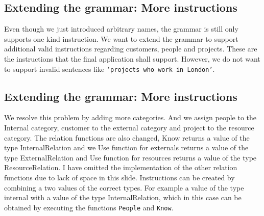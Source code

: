 \documentclass[
10pt, %
a4paper, %
oneside, %
headinclude,footinclude, %
BCOR5mm, %
]{scrartcl}
\begin{document}
\subsection{Extending the grammar: More instructions}
Even though we just introduced arbitrary names, the grammar is still only supports one kind instruction.
\newline
\newline
We want to extend the grammar to support additional valid instructions regarding customers, people and projects.
\newline
\newline
These are the instructions that the final application shall support.
\newline
\newline
However, we do not want to support invalid sentences like \texttt{'projects who work in London'}.

\subsection{Extending the grammar: More instructions}
We resolve this problem by adding more categories.
\newline
\newline
And we assign people to the Internal category, customer to the external category and project to the resource category.
\newline
\newline
The relation functions are also changed, Know returns a value of the type InternalRelation and we Use function for externals returns a value of the type ExternalRelation and Use function for resources returns a value of the type ResourceRelation. I have omitted the implementation of the other relation functions due to lack of space in this slide.
\newline
\newline
Instructions can be created by combining a two values of the correct types. For example a value of the type internal with a value of the type InternalRelation, which in this case can be obtained by executing the functions \texttt{People} and \texttt{Know}.
\end{document}
